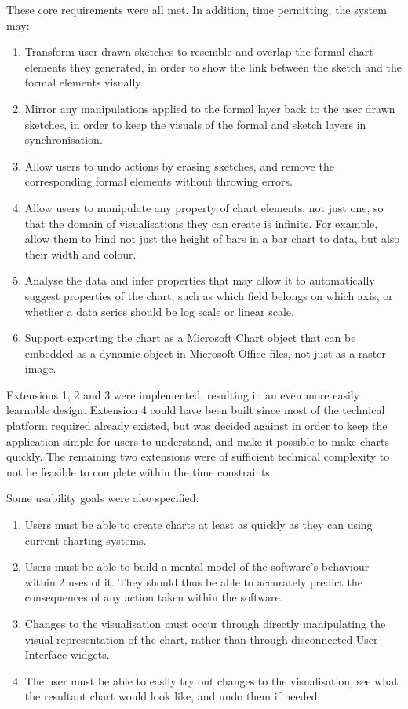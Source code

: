 	These core requirements were all met.
	In addition, time permitting, the system may:
	\begin{enumerate}[label=\bfseries Extension \arabic*]
		\item Transform user-drawn sketches to resemble and overlap the formal chart elements they generated, in order to show the link between the sketch and the formal elements visually.
		\item Mirror any manipulations applied to the formal layer back to the user drawn sketches, in order to keep the visuals of the formal and sketch layers in synchronisation.
		\item Allow users to undo actions by erasing sketches, and remove the corresponding formal elements without throwing errors.
		\item Allow users to manipulate any property of chart elements, not just one, so that the domain of visualisations they can create is infinite. For example, allow them to bind not just the height of bars in a bar chart to data, but also their width and colour. 
		\item Analyse the data and infer properties that may allow it to automatically suggest properties of the chart, such as which field belongs on which axis, or whether a data series should be log scale or linear scale.
		\item Support exporting the chart as a Microsoft Chart object that can be embedded as a dynamic object in Microsoft Office files, not just as a raster image.
	\end{enumerate}
	
	Extensions 1, 2 and 3 were implemented, resulting in an even more easily learnable design. Extension 4 could have been built since most of the technical platform required already existed, but was decided against in order to keep the application simple for users to understand, and make it possible to make charts quickly. The remaining two extensions were of sufficient technical complexity to not be feasible to complete within the time constraints.	
	
	Some usability goals were also specified:
	\begin{enumerate}[label=\bfseries Usability \arabic*]
		\item Users must be able to create charts at least as quickly as they can using current charting systems.
		\item Users must be able to build a mental model of the software's behaviour within 2 uses of it. They should thus be able to accurately predict the consequences of any action taken within the software.
		\item Changes to the visualisation must occur through directly manipulating the visual representation of the chart, rather than through disconnected User Interface widgets.
		\item The user must be able to easily try out changes to the visualisation, see what the resultant chart would look like, and undo them if needed.
	\end{enumerate}
	
